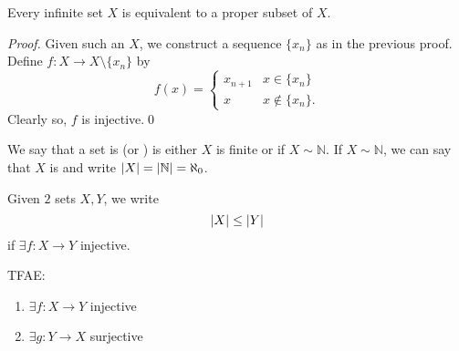 \documentclass[notoc,notitlepage]{tufte-book}
\begin{document}
\begin{crly}
\label{crly:infinite_sets_are_equivalent_to_its_proper_subsets}
  Every infinite set $X$ is equivalent to a proper subset of $X$.
\end{crly}

\begin{proof}
  Given such an $X$, we construct a sequence $\{ x_n \}$ as in the previous proof. Define $f : X \to X \setminus \{ x_n \}$ by
  \begin{equation*}
    f(x) = \begin{cases}
      x_{n + 1} & x \in \{x_n\} \\
      x         & x \notin \{ x_n \}.
    \end{cases}
  \end{equation*}
  Clearly so, $f$ is injective.\qed
\end{proof}

\begin{defn}[Countable]
\label{defn:countable}
  We say that a set is  (or ) is either $X$ is finite or if $X \sim \mathbb{N}$. If $X \sim \mathbb{N}$, we can say that $X$ is  and write $\left|X\right| = \left|\mathbb{N}\right| = \aleph_0$.
\end{defn}

\begin{defn}
\label{defn:smaller_cardinality}
  Given $2$ sets $X, Y$, we write
  \begin{equation*}
    \left|X\right| \leq \left|Y\right|
  \end{equation*}
  if $\exists f : X \to Y$ injective.
\end{defn}

\begin{propo}
\label{propo:injectivity_is_surjectivity_reversed}
  TFAE:
  \begin{enumerate}
    \item $\exists f : X \to Y$ injective
    \item $\exists g : Y \to X$ surjective
  \end{enumerate}
\end{propo}
\end{document}
